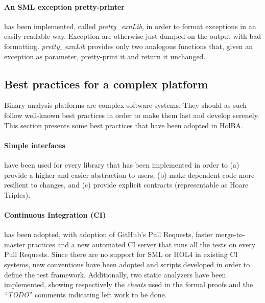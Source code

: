 \documentclass[10pt,a4paper]{article}
\begin{document}
\begin{multicols}{2}
\paragraph{An SML exception pretty-printer} has been implemented, called \textit{pretty\_exnLib}, in order to format exceptions in an easily readable way. Exception are otherwise just dumped on the output with bad formatting. \textit{pretty\_exnLib} provides only two analogous functions that, given an exception as parameter, pretty-print it and return it unchanged.

\subsection{Best practices for a complex platform} \label{best-practices-complex-platform}

Binary analysis platforms are complex software systems. They should as such follow well-known best practices in order to make them last and develop serenely. This section presents some best practices that have been adopted in HolBA.

\paragraph{Simple interfaces} have been used for every library that has been implemented in order to (a) provide a higher and easier abstraction to users, (b) make dependent code more resilient to changes, and (c) provide explicit contracts (representable as Hoare Triples).

\paragraph{Continuous Integration (CI)} has been adopted, with adoption of GitHub's Pull Requests, faster merge-to-master practices and a new automated CI server that runs all the tests on every Pull Requests. Since there are no support for SML or HOL4 in existing CI systems, new conventions have been adopted and scripts developed in order to define the test framework. Additionally, two static analyzers have been implemented, showing respectively the \textit{cheats} used in the formal proofs and the ``\textit{TODO}'' comments indicating left work to be done.



\end{multicols}
\end{document}
